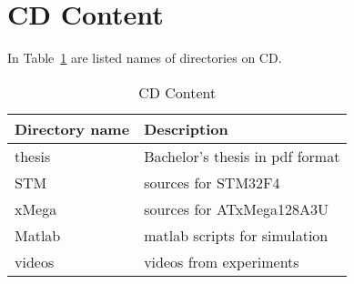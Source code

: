 \section{CD Content}

In Table~\ref{tab:obsah} are listed names of directories on CD.

\vspace{1cm}
\begin{table}[!htb]
\centering
\begin{tabular}{lp{10cm}}
\hline
\textbf{Directory name} & \textbf{Description} \\
\hline
thesis & Bachelor's thesis in pdf format\\
STM & sources for STM32F4 \\
xMega & sources for ATxMega128A3U \\
Matlab & matlab scripts for simulation \\
videos & videos from experiments \\
\hline
\end{tabular}
\caption{CD Content}
\label{tab:obsah}
\end{table}